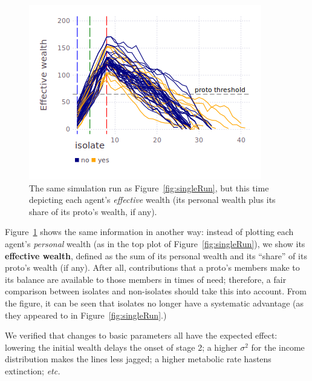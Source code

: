 \begin{figure}[ht]
\centering
\includegraphics[width=\columnwidth]{figures/sampleEffectiveHistory.png}
\caption{The same simulation run as Figure~\ref{fig:singleRun}, but this time
depicting each agent's \textit{effective} wealth (its personal wealth plus its
share of its proto's wealth, if any).}
\label{fig:effectiveWealthSingleRun}
\end{figure}

Figure~\ref{fig:effectiveWealthSingleRun} shows the same information in another
way: instead of plotting each agent's \textit{personal} wealth (as in the top
plot of Figure~\ref{fig:singleRun}), we show its \textbf{effective wealth},
defined as the sum of its personal wealth and its ``share'' of its proto's
wealth (if any). After all, contributions that a proto's members make to its
balance are available to those members in times of need; therefore, a fair
comparison between isolates and non-isolates should take this into account.
From the figure, it can be seen that isolates no longer have a systematic
advantage (as they appeared to in Figure~\ref{fig:singleRun}.)

We verified that changes to basic parameters all have the expected effect:
lowering the initial wealth delays the onset of stage 2; a higher $\sigma^2$
for the income distribution makes the lines less jagged; a higher metabolic
rate hastens extinction; \textit{etc.}


